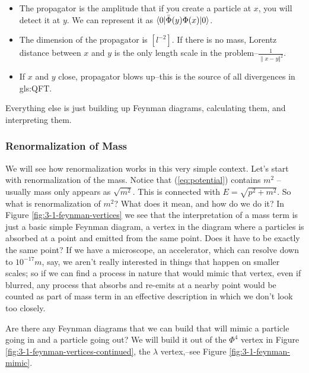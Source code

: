 \documentclass[]{article}
\begin{document}
\begin{itemize}
	\item The propagator is the amplitude that if you create a particle at $x$, you will detect it at $y$. We can represent it as $\braket{0|\bar{\Phi}(y)\Phi(x)|0}$.
	\item The dimension of the propagator is $[l^{-2}]$. If there is no mass, Lorentz distance between $x$ and $y$ is the only length scale in the problem--$\frac{1}{\lVert x-y \Vert^2}$. 
	\item If $x$ and $y$ close, propagator blows up--this is the source of all divergences in \gls{gls:QFT}.
\end{itemize}

Everything else is just building up Feynman diagrams, calculating them, and interpreting them.

\subsubsection{Renormalization of Mass}

We will see how renormalization works in this very simple context. Let's start with renormalization of the mass. Notice that (\ref{eq:potential}) contains $m^2$ -- usually mass only appears as $\sqrt{m^2}$. This is connected with $E=\sqrt{p^2 + m^2}$. So what is renormalization of $m^2$? What does it mean, and how do we do it? In Figure \ref{fig:3-1-feynman-vertices} we see that the interpretation of a mass term is just a basic simple Feynman diagram, a vertex in the diagram where a particles is absorbed at a point and emitted from the same point. Does it have to be exactly the same point? If we have a microscope, an accelerator, which can resolve down to $10^{-17}m$, say, we aren't really interested in things that happen on smaller scales; so if we can find a process in nature that would mimic that vertex,  even if blurred, any process that absorbs and re-emits at a nearby point would be counted as part of mass term in an effective description in which we don't look too closely.

Are there any Feynman diagrams that we can build that will mimic a particle going in and a particle going out? We will build it out of the $\Phi^4$ vertex in Figure \ref{fig:3-1-feynman-vertices-continued}, the $\lambda$ vertex,--see Figure \ref{fig:3-1-feynman-mimic}.
\end{document}
